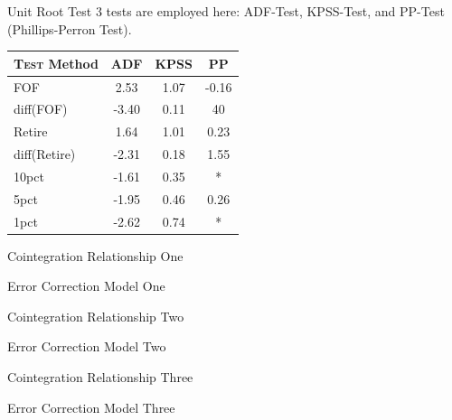 \documentclass[xcolor=dvipsnames]{beamer}
\begin{document}
\begin{frame}{Unit Root Test}
	3 tests are employed here: ADF-Test, KPSS-Test, and PP-Test (Phillips-Perron Test). \\
	\begin{tabular}{|l| c| c| c|}
	\hline
	\textsc{Test} Method &  ADF   & KPSS &  PP   \\ \hline
	FOF 				 &  2.53  & 1.07 & -0.16 \\ \hline
	diff(FOF) 			 & -3.40  & 0.11 & 40 	 \\ \hline
	Retire 				 &  1.64  & 1.01 & 0.23  \\ \hline
	diff(Retire) 		 & -2.31  & 0.18 & 1.55  \\ \hline
	10pct 				 & -1.61  & 0.35 &   * 	 \\ \hline
	5pct 				 & -1.95  & 0.46 & 0.26  \\ \hline
	1pct 				 & -2.62  & 0.74 &   * \\ \hline

	\end{tabular}

\end{frame}


\begin{frame}{Cointegration Relationship One}

\end{frame}


\begin{frame}{Error Correction Model One}
\end{frame}


\begin{frame}{Cointegration Relationship Two}
\end{frame}


\begin{frame}{Error Correction Model Two}
\end{frame}


\begin{frame}{Cointegration Relationship Three}
\end{frame}


\begin{frame}{Error Correction Model Three}
\end{frame}
\end{document}
